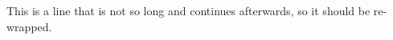 \documentclass{article}
\begin{document}
This is a line that is not so long
and continues afterwards, so it should be re-wrapped.
\end{document}
